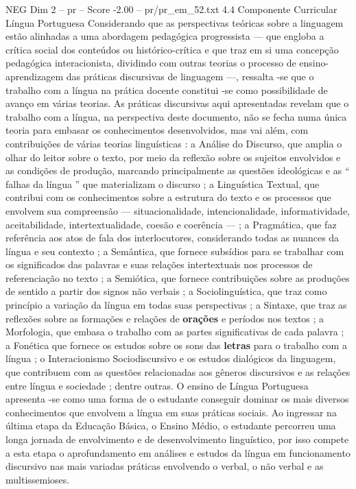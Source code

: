 \begin{textsample}{NEG Dim 2 – pr – Score -2.00 – pr/pr\_em\_52.txt}  \label{ex:f2_neg_174}
4.4 Componente Curricular Língua Portuguesa Considerando que as perspectivas teóricas sobre a linguagem estão alinhadas a uma abordagem pedagógica progressista — que engloba a crítica social dos conteúdos ou histórico-crítica e que traz em si uma concepção pedagógica interacionista, dividindo com outras teorias o processo de ensino-aprendizagem das práticas discursivas de linguagem —, ressalta -se que o trabalho com a língua na prática docente constitui -se como possibilidade de avanço em várias teorias.
As práticas discursivas aqui apresentadas revelam que o trabalho com a língua, na perspectiva deste documento, não se fecha numa única teoria para embasar os conhecimentos desenvolvidos, mas vai além, com contribuições de várias teorias linguísticas : a Análise do Discurso, que amplia o olhar do leitor sobre o texto, por meio da reflexão sobre os sujeitos envolvidos e as condições de produção, marcando principalmente as questões ideológicas e as “ falhas da língua ” que materializam o discurso ; a Linguística Textual, que contribui com os conhecimentos sobre a estrutura do texto e os processos que envolvem sua compreensão — situacionalidade, intencionalidade, informatividade, aceitabilidade, intertextualidade, coesão e coerência — ; a Pragmática, que faz referência aos atos de fala dos interlocutores, considerando todas as nuances da língua e seu contexto ; a Semântica, que fornece subsídios para se trabalhar com os significados das palavras e suas relações intertextuais nos processos de referenciação no texto ; a Semiótica, que fornece contribuições sobre as produções de sentido a partir dos signos não verbais ; a Sociolinguística, que traz como princípio a variação da língua em todas suas perspectivas ; a Sintaxe, que traz as reflexões sobre as formações e relações de \textbf{orações} e períodos nos textos ; a Morfologia, que embasa o trabalho com as partes significativas de cada palavra ; a Fonética que fornece os estudos sobre os sons das \textbf{letras} para o trabalho com a língua ; o Interacionismo Sociodiscursivo e os estudos dialógicos da linguagem, que contribuem com as questões relacionadas aos gêneros discursivos e as relações entre língua e sociedade ; dentre outras.
O ensino de Língua Portuguesa apresenta -se como uma forma de o estudante conseguir dominar os mais diversos conhecimentos que envolvem a língua em suas práticas sociais.
Ao ingressar na última etapa da Educação Básica, o Ensino Médio, o estudante percorreu uma longa jornada de envolvimento e de desenvolvimento linguístico, por isso compete a esta etapa o aprofundamento em análises e estudos da língua em funcionamento discursivo nas mais variadas práticas envolvendo o verbal, o não verbal e as multissemioses.

\end{textsample}
